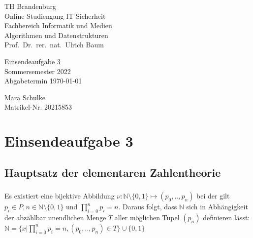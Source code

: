 \documentclass{article}
\begin{document}
\begin{titlepage}
	\begin{flushleft}
		TH Brandenburg\\
		Online Studiengang IT Sicherheit\\
		Fachbereich Informatik und Medien\\
		Algorithmen und Datenstrukturen\\
		Prof.\ Dr.\ rer.\ nat.\ Ulrich Baum
	\end{flushleft}

	\vfill

	\begin{center}
		\Large{Einsendeaufgabe 3}\\[0.5em]
		\large{Sommersemester 2022}\\[0.25em]
		\large{Abgabetermin \today}
	\end{center}

	\vfill

	\begin{flushright}
		Mara Schulke \\
		Matrikel-Nr. 20215853
	\end{flushright}
\end{titlepage}

\newpage

\section*{Einsendeaufgabe 3}

\subsection{Hauptsatz der elementaren Zahlentheorie}

\subsubsection{}

Es existiert eine bijektive Abbildung $\nu: \mathbb{N} \setminus \{0,1\} \mapsto (p_0,..,p_n)$
bei der gilt $p_i \in P, n \in \mathbb{N} \setminus \{0,1\}$ und $\prod_{i=0}^{n} p_i = n$.
Daraus folgt, dass $\mathbb{N}$ sich in Abhängigkeit der abzählbar unendlichen
Menge $T$ aller möglichen Tupel $(p_n)$ definieren lässt:
$\mathbb{N} = \{ x | \prod_{i=0}^{n} p_i = n, (p_0,..,p_n) \in T \} \cup \{0,1\}$

\subsubsection{}
\end{document}
